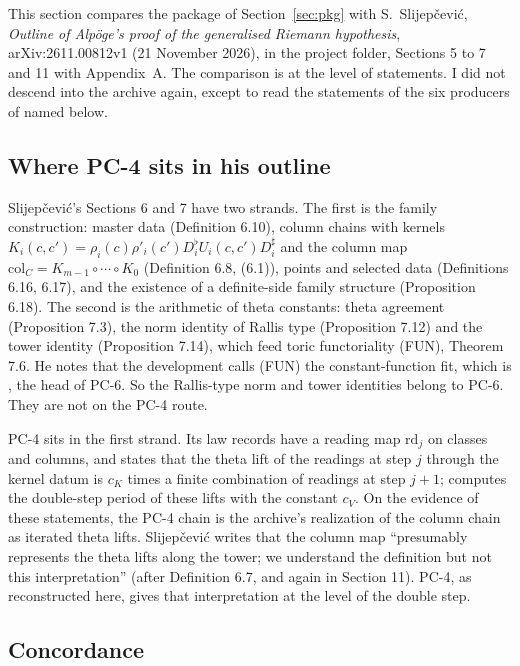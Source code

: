 \documentclass[11pt]{article}
\begin{document}
This section compares the package of Section~\ref{sec:pkg} with S.~Slijepčević, \emph{Outline of Alpöge's proof of the generalised Riemann hypothesis}, arXiv:2611.00812v1 (21 November 2026), in the project folder, Sections 5 to 7 and 11 with Appendix~A. The comparison is at the level of statements. I did not descend into the archive again, except to read the statements of the six producers of  named below.

\subsection{Where PC-4 sits in his outline}

Slijepčević's Sections 6 and 7 have two strands. The first is the family construction: master data (Definition 6.10), column chains with kernels $K_i(c,c')=\rho_i(c)\rho'_i(c')D_i^\flat U_i(c,c')D_i^\sharp$ and the column map $\mathrm{col}_C=K_{m-1}\circ\cdots\circ K_0$ (Definition 6.8, (6.1)), points and selected data (Definitions 6.16, 6.17), and the existence of a definite-side family structure (Proposition 6.18). The second is the arithmetic of theta constants: theta agreement (Proposition 7.3), the norm identity of Rallis type (Proposition 7.12) and the tower identity (Proposition 7.14), which feed toric functoriality (FUN), Theorem 7.6. He notes that the development calls (FUN) the constant-function fit, which is , the head of PC-6. So the Rallis-type norm and tower identities belong to PC-6. They are not on the PC-4 route.

PC-4 sits in the first strand. Its law records have a reading map $\mathrm{rd}_j$ on classes and columns, and  states that the theta lift of the readings at step $j$ through the kernel datum is $c_K$ times a finite combination of readings at step $j+1$;  computes the double-step period of these lifts with the constant $c_V$. On the evidence of these statements, the PC-4 chain is the archive's realization of the column chain as iterated theta lifts. Slijepčević writes that the column map ``presumably represents the theta lifts along the tower; we understand the definition but not this interpretation'' (after Definition 6.7, and again in Section 11). PC-4, as reconstructed here, gives that interpretation at the level of the double step.

\subsection{Concordance}
\end{document}
